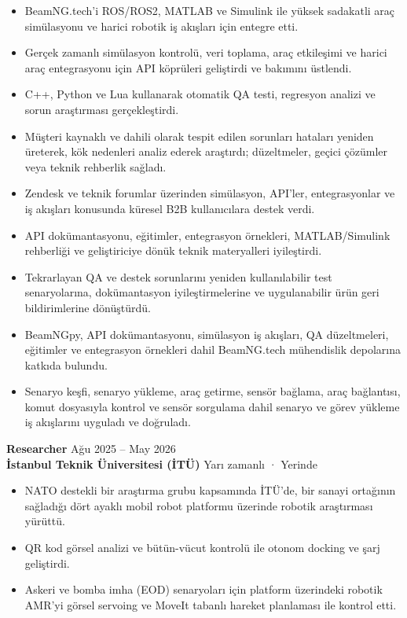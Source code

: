 \documentclass[11pt,a4paper]{article}
\begin{document}
\begin{itemize}
    \item BeamNG.tech'i ROS/ROS2, MATLAB ve Simulink ile yüksek sadakatli araç simülasyonu ve harici robotik iş akışları için entegre etti.
    \item Gerçek zamanlı simülasyon kontrolü, veri toplama, araç etkileşimi ve harici araç entegrasyonu için API köprüleri geliştirdi ve bakımını üstlendi.
    \item C++, Python ve Lua kullanarak otomatik QA testi, regresyon analizi ve sorun araştırması gerçekleştirdi.
    \item Müşteri kaynaklı ve dahili olarak tespit edilen sorunları hataları yeniden üreterek, kök nedenleri analiz ederek araştırdı; düzeltmeler, geçici çözümler veya teknik rehberlik sağladı.
    \item Zendesk ve teknik forumlar üzerinden simülasyon, API'ler, entegrasyonlar ve iş akışları konusunda küresel B2B kullanıcılara destek verdi.
    \item API dokümantasyonu, eğitimler, entegrasyon örnekleri, MATLAB/Simulink rehberliği ve geliştiriciye dönük teknik materyalleri iyileştirdi.
    \item Tekrarlayan QA ve destek sorunlarını yeniden kullanılabilir test senaryolarına, dokümantasyon iyileştirmelerine ve uygulanabilir ürün geri bildirimlerine dönüştürdü.
    \item BeamNGpy, API dokümantasyonu, simülasyon iş akışları, QA düzeltmeleri, eğitimler ve entegrasyon örnekleri dahil BeamNG.tech mühendislik depolarına katkıda bulundu.
    \item Senaryo keşfi, senaryo yükleme, araç getirme, sensör bağlama, araç bağlantısı, komut dosyasıyla kontrol ve sensör sorgulama dahil senaryo ve görev yükleme iş akışlarını uyguladı ve doğruladı.
\end{itemize}

\textbf{\color{PrimaryColor}Researcher} \hfill Ağu 2025 -- May 2026\\
\textbf{İstanbul Teknik Üniversitesi (İTÜ)} \hfill Yarı zamanlı · Yerinde

\begin{itemize}
    \item NATO destekli bir araştırma grubu kapsamında İTÜ'de, bir sanayi ortağının sağladığı dört ayaklı mobil robot platformu üzerinde robotik araştırması yürüttü.
    \item QR kod görsel analizi ve bütün-vücut kontrolü ile otonom docking ve şarj geliştirdi.
    \item Askeri ve bomba imha (EOD) senaryoları için platform üzerindeki robotik AMR'yi görsel servoing ve MoveIt tabanlı hareket planlaması ile kontrol etti.
\end{itemize}
\end{document}
